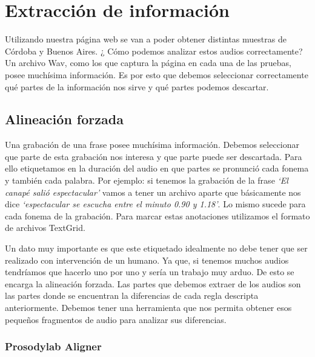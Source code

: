 \chapter{Extracción de información}

Utilizando nuestra página web se van a poder obtener distintas muestras de Córdoba y Buenos Aires. ¿ Cómo podemos analizar estos audios correctamente? Un archivo Wav, como los que captura la página en cada una de las pruebas, posee muchísima información. Es por esto que debemos seleccionar correctamente qué partes de la información nos sirve y qué partes podemos descartar. 

\section{Alineación forzada}

Una grabación de una frase posee muchísima información. Debemos seleccionar que parte de esta grabación nos interesa y que parte puede ser descartada. Para ello etiquetamos en la duración del audio en que partes se pronunció cada fonema y también cada palabra. Por ejemplo: si tenemos la grabación de la frase \textit{`El canapé salió espectacular’} vamos a tener un archivo aparte que básicamente nos dice \textit{`espectacular se escucha entre el minuto 0.90 y 1.18’}. Lo mismo sucede para cada fonema de la grabación. Para marcar estas anotaciones utilizamos el formato de archivos TextGrid.

Un dato muy importante es que este etiquetado idealmente no debe tener que ser realizado con intervención de un humano. Ya que, si tenemos muchos audios tendríamos que hacerlo uno por uno y sería un trabajo muy arduo. De esto se encarga la alineación forzada. Las partes que debemos extraer de los audios son las partes donde se encuentran la diferencias de cada regla descripta anteriormente. Debemos tener una herramienta que nos permita obtener esos pequeños fragmentos de audio para analizar sus diferencias. 

\subsection{Prosodylab Aligner}


